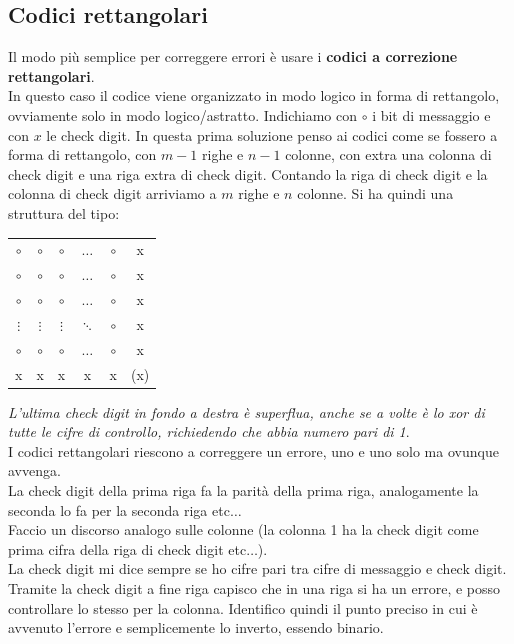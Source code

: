 \documentclass[a4paper,12pt, oneside]{book}
\begin{document}
\subsection{Codici rettangolari}
Il modo più semplice per correggere errori è usare i \textbf{codici a correzione
  rettangolari}. \\
In questo caso il codice viene organizzato in modo logico in forma di
rettangolo, ovviamente solo in modo logico/astratto.
Indichiamo con $\circ$ i bit di messaggio e con $x$ le check digit. In questa
prima soluzione penso ai codici come se fossero a forma di rettangolo, con $m-1$
righe e $n-1$ colonne, con extra una colonna di check digit e una riga extra di
check digit. Contando la riga di check digit e la colonna di check digit
arriviamo a $m$ righe e $n$ colonne. Si ha quindi una struttura del tipo:
\begin{table}[H]
  \centering
  \begin{tabular}{cccccc}
    $\circ$ & $\circ$ & $\circ$ &$\ldots$ & $\circ$ & x\\
    $\circ$ & $\circ$ & $\circ$ &$\ldots$ & $\circ$ & x\\
    $\circ$ & $\circ$ & $\circ$ &$\ldots$ & $\circ$ & x\\
    $\vdots$ & $\vdots$ & $\vdots$ &$\ddots$ & $\circ$ & x\\
    $\circ$ & $\circ$ & $\circ$ &$\ldots$ & $\circ$ & x\\
    x&x&x&x&x&(x)
  \end{tabular}
\end{table}
\textit{L'ultima check digit in fondo a destra è superflua, anche se a volte è
  lo xor di tutte le cifre di controllo, richiedendo che abbia numero pari di
  1}.\\ 
I codici rettangolari riescono a correggere un errore, uno e uno solo ma ovunque
avvenga.\\
La check digit della prima riga fa la parità della prima riga, analogamente la
seconda lo fa per la seconda riga etc$\ldots$\\
Faccio un discorso analogo sulle colonne (la colonna 1 ha la check digit come
prima cifra della riga di check digit etc$\ldots$).\\
La check digit mi dice sempre se ho cifre pari tra cifre di messaggio e check
digit.\\ 
Tramite la check digit a fine riga capisco che in una riga si ha un errore, e
posso controllare lo stesso per la colonna. Identifico quindi il punto preciso
in cui è avvenuto l'errore e semplicemente lo inverto, essendo binario.\\
\end{document}
